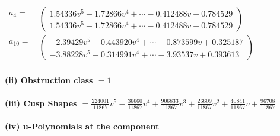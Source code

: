 \documentclass[1p]{elsarticle_modified}
\theoremstyle{definition}
\begin{document}
\begin{tabular}{m{7pt} m{180pt} m{7pt} m{180pt} }
\flushright $a_{4}=$&$\begin{pmatrix}1.54336 v^{5}-1.72866 v^{4}+\cdots-0.412488 v-0.784529\\1.54336 v^{5}-1.72866 v^{4}+\cdots-0.412488 v-0.784529\end{pmatrix}$ \\
\flushright $a_{10}=$&$\begin{pmatrix}-2.39429 v^{5}+0.443920 v^{4}+\cdots-0.873599 v+0.325187\\-3.88228 v^{5}+0.314991 v^{4}+\cdots-3.93537 v+0.393613\end{pmatrix}$\\&\end{tabular}
\flushleft \textbf{(ii) Obstruction class $= 1$}\\~\\
\flushleft \textbf{(iii) Cusp Shapes $= \frac{224001}{11867} v^5-\frac{36660}{11867} v^4+\frac{906833}{11867} v^3+\frac{26609}{11867} v^2+\frac{40841}{11867} v+\frac{96708}{11867}$}\\~\\
\newpage\renewcommand{\arraystretch}{1}
\flushleft \textbf{(iv) u-Polynomials at the component}\newline \\
\end{document}

